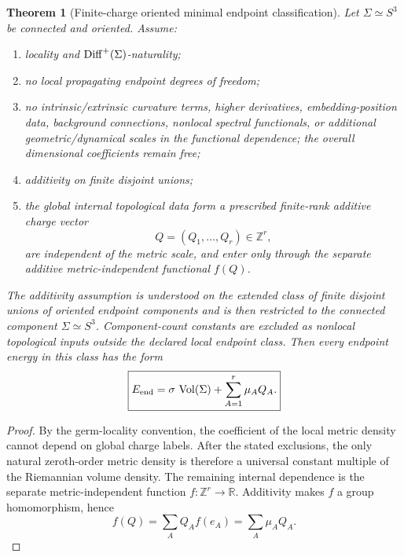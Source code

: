 \documentclass[11pt,a4paper]{article}
\numberwithin{equation}{section}
\theoremstyle{definition}
\theoremstyle{plain}
\newtheorem{theorem}[criterion]{Theorem}
\theoremstyle{remark}
\begin{document}
\begin{theorem}[Finite-charge oriented minimal endpoint classification]
Let \(\Sigma\simeq S^3\) be connected and oriented. Assume:
\begin{enumerate}
\item locality and \({\rm Diff}^{+}(\Sigma)\)-naturality;
\item no local propagating endpoint degrees of freedom;
\item no intrinsic/extrinsic curvature terms, higher derivatives, embedding-position data, background connections, nonlocal spectral functionals, or additional geometric/dynamical scales in the functional dependence; the overall dimensional coefficients remain free;
\item additivity on finite disjoint unions;
\item the global internal topological data form a prescribed finite-rank additive charge vector
\begin{equation}
Q=(Q_1,\ldots,Q_r)\in\mathbb Z^r,
\end{equation}
are independent of the metric scale, and enter only through the separate additive metric-independent functional \(f(Q)\).
\end{enumerate}
The additivity assumption is understood on the extended class of finite disjoint unions of oriented endpoint components and is then restricted to the connected component \(\Sigma\simeq S^3\). Component-count constants are excluded as nonlocal topological inputs outside the declared local endpoint class. Then every endpoint energy in this class has the form
\begin{equation}
\boxed{
E_{\rm end}
=
\sigma\,\operatorname{Vol}(\Sigma)
+\sum_{A=1}^{r}\mu_AQ_A.
}
\end{equation}
\end{theorem}
\begin{proof}
By the germ-locality convention, the coefficient of the local metric density cannot depend on global charge labels. After the stated exclusions, the only natural zeroth-order metric density is therefore a universal constant multiple of the Riemannian volume density. The remaining internal dependence is the separate metric-independent function \(f:\mathbb Z^r\to\mathbb R\). Additivity makes \(f\) a group homomorphism, hence
\begin{equation}
f(Q)=\sum_AQ_Af(e_A)=\sum_A\mu_AQ_A.
\end{equation}
\end{proof}
\end{document}
